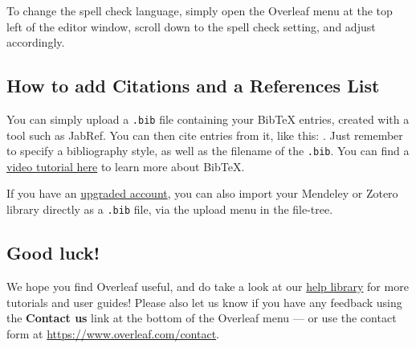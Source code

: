 \documentclass[twocolumn]{ltjsarticle}
\begin{document}
            To change the spell check language, simply open the Overleaf menu at the top left of the editor window, scroll down to the spell check setting, and adjust accordingly.

      \subsection{How to add Citations and a References List}

            You can simply upload a \verb|.bib| file containing your BibTeX entries, created with a tool such as JabRef. You can then cite entries from it, like this: \cite{greenwade93}. Just remember to specify a bibliography style, as well as the filename of the \verb|.bib|. You can find a \href{https://www.overleaf.com/help/97-how-to-include-a-bibliography-using-bibtex}{video tutorial here} to learn more about BibTeX.

            If you have an \href{https://www.overleaf.com/user/subscription/plans}{upgraded account}, you can also import your Mendeley or Zotero library directly as a \verb|.bib| file, via the upload menu in the file-tree.

      \subsection{Good luck!}

            We hope you find Overleaf useful, and do take a look at our \href{https://www.overleaf.com/learn}{help library} for more tutorials and user guides! Please also let us know if you have any feedback using the \textbf{Contact us} link at the bottom of the Overleaf menu --- or use the contact form at \url{https://www.overleaf.com/contact}.

            
            
\end{document}
